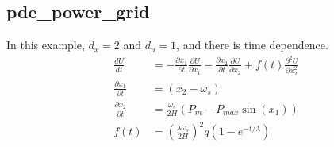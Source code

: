 \documentclass{article}
\begin{document}
\subsection{pde\_power\_grid}

In this example, $d_x = 2$ and $d_u = 1$, and there is time dependence.
\begin{align*}
\frac{dU}{dt} &= - \frac{\partial x_1}{\partial t} \frac{\partial U}{\partial x_1}
                 - \frac{\partial x_2}{\partial t} \frac{\partial U}{\partial x_2}
                 + f(t) \frac{\partial^2 U}{\partial x_2^2}
\\ \frac{\partial x_1}{\partial t} &= (x_2 - \omega_s)
\\ \frac{\partial x_2}{\partial t} &= \frac{\omega_s}{2H}(P_m - P_{max}\sin(x_1))
\\ f(t) &= \left(\frac{\lambda \omega_s}{2H}\right) ^ 2 q (1-e^{-t/\lambda})
\end{align*}
\end{document}
